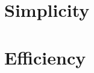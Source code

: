 \documentclass[]{tufte-handout}
\begin{document}
 
\section{Simplicity}

\section{Efficiency}

\end{document}
